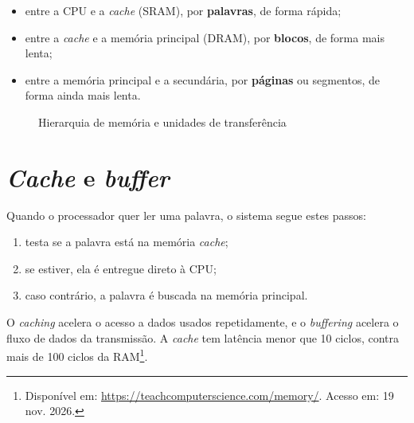 \begin{itemize}
  \item entre a CPU e a \textit{cache} (SRAM), por \textbf{palavras}, de forma rápida;
  
  \item entre a \textit{cache} e a memória principal (DRAM), por \textbf{blocos}, de forma mais lenta;
  
  \item entre a memória principal e a secundária, por \textbf{páginas} ou segmentos, de forma ainda mais lenta.
  
\end{itemize}

\begin{figure}[H]
  \centering
  \caption{Hierarquia de memória e unidades de transferência}\label{fig:hierarquia}
\end{figure}

\section{\textit{Cache} e \textit{buffer}}

Quando o processador quer ler uma palavra, o sistema segue estes passos:
\begin{enumerate}
  \item testa se a palavra está na memória \textit{cache};
  \item se estiver, ela é entregue direto à CPU;
  \item caso contrário, a palavra é buscada na memória principal.
\end{enumerate}
O \textit{caching} acelera o acesso a dados usados repetidamente, e o \textit{buffering} acelera o fluxo de dados da transmissão. A \textit{cache} tem latência menor que 10 ciclos, contra mais de 100 ciclos da RAM\footnote{Disponível em: \url{https://teachcomputerscience.com/memory/}. Acesso em: 19 nov. 2026.}.

